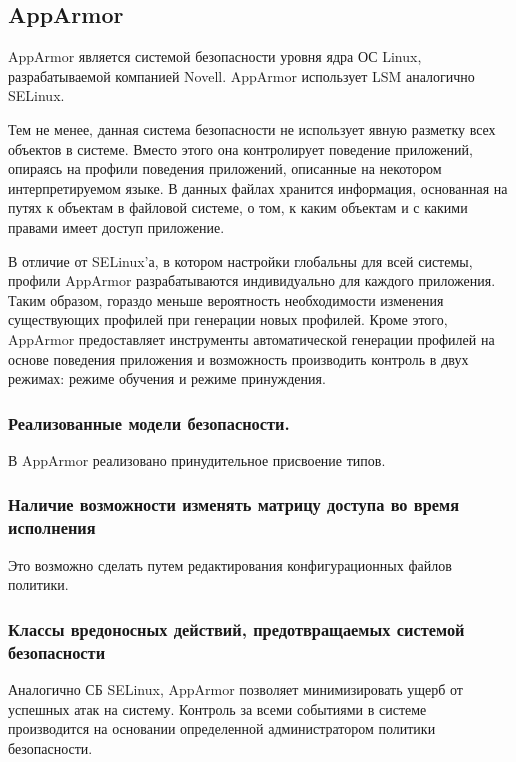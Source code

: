 \subsection{AppArmor}

AppArmor является системой безопасности уровня 
ядра ОС Linux, разрабатываемой компанией Novell. 
AppArmor использует LSM аналогично SELinux. 

Тем не менее, данная система безопасности не использует
явную разметку всех объектов в системе.
Вместо этого она контролирует поведение 
приложений, опираясь на профили поведения
приложений, описанные на некотором интерпретируемом
языке. 
В данных файлах хранится информация, основанная на 
путях к объектам в файловой системе, о том, к каким 
объектам и с какими правами имеет доступ приложение. 

В отличие от SELinux'а, 
в котором настройки глобальны для всей системы, профили 
AppArmor разрабатываются индивидуально для каждого 
приложения.
Таким образом, гораздо меньше вероятность 
необходимости изменения существующих профилей при 
генерации новых профилей. Кроме этого, 
AppArmor предоставляет инструменты 
автоматической генерации профилей на основе поведения 
приложения и возможность производить контроль в двух 
режимах: режиме обучения и режиме принуждения. 

\subsubsection{Реализованные модели безопасности.} 

В AppArmor реализовано принудительное присвоение типов. 

\subsubsection{Наличие возможности изменять матрицу доступа 
	во время исполнения} 

Это возможно сделать путем редактирования конфигурационных
файлов политики. 

\subsubsection{Классы вредоносных действий, предотвращаемых
	системой безопасности} 

Аналогично СБ SELinux, AppArmor позволяет 
минимизировать ущерб от успешных атак на систему. 
Контроль за всеми событиями в системе производится 
на основании определенной администратором политики 
безопасности. 

